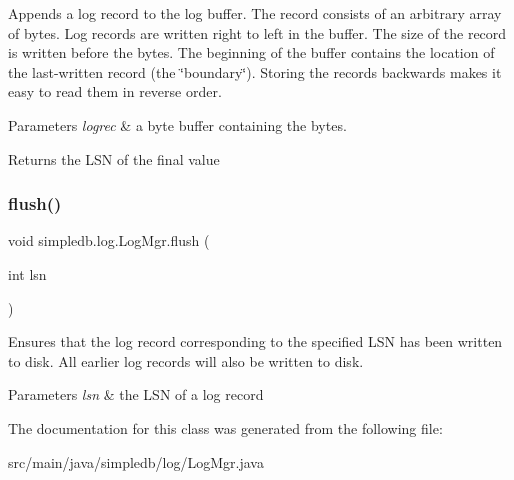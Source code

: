 Appends a log record to the log buffer. The record consists of an arbitrary array of bytes. Log records are written right to left in the buffer. The size of the record is written before the bytes. The beginning of the buffer contains the location of the last-\/written record (the \char`\"{}boundary\char`\"{}). Storing the records backwards makes it easy to read them in reverse order. 
\begin{DoxyParams}{Parameters}
{\em logrec} & a byte buffer containing the bytes. \\
\hline
\end{DoxyParams}
\begin{DoxyReturn}{Returns}
the L\+SN of the final value 
\end{DoxyReturn}
\mbox{\label{classsimpledb_1_1log_1_1LogMgr_a6624ee41235ebaa1297551d51a7946ac}} 
\subsubsection{\texorpdfstring{flush()}{flush()}}
{\footnotesize\ttfamily void simpledb.\+log.\+Log\+Mgr.\+flush (\begin{DoxyParamCaption}\item[{int}]{lsn }\end{DoxyParamCaption})\hspace{0.3cm}{\ttfamily [inline]}}

Ensures that the log record corresponding to the specified L\+SN has been written to disk. All earlier log records will also be written to disk. 
\begin{DoxyParams}{Parameters}
{\em lsn} & the L\+SN of a log record \\
\hline
\end{DoxyParams}


The documentation for this class was generated from the following file\+:\begin{DoxyCompactItemize}
\item 
src/main/java/simpledb/log/Log\+Mgr.\+java\end{DoxyCompactItemize}
